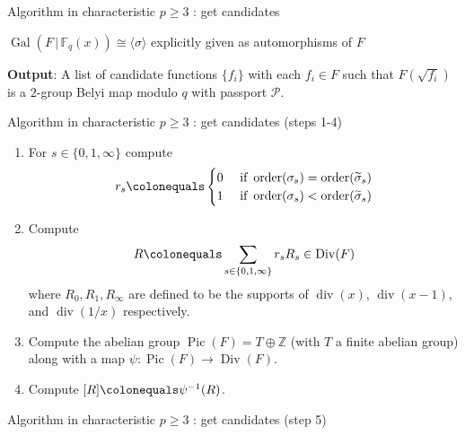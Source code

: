 \documentclass[xcolor=dvipsnames,handout]{beamer}
\theoremstyle{plain}
\newcommand{\ZZ}{\mathbb Z}
\newcommand{\wt}[1]{\widetilde{#1}}
\newcommand{\FF}{\mathbb{F}}
\DeclareMathOperator{\Div}{Div}
\DeclareMathOperator{\Pic}{Pic}
\DeclareMathOperator{\ddiv}{div}
\DeclareMathOperator{\order}{order}
\DeclareMathOperator{\Gal}{Gal}
\begin{document}
{\begin{frame}{Algorithm in characteristic $p\geq 3$ : get candidates}
\begin{itemize}
          $\Gal(F\,|\,\FF_q(x))\cong
          \langle\sigma\rangle$
          explicitly given
          as automorphisms of $F$
      \end{itemize}
      \textbf{Output}:
      A list of candidate functions
      $\{f_i\}$ with each $f_i\in F$
      such that $F(\sqrt{f_i})$ is a
      $2$-group Belyi map modulo $q$
      with passport $\mathcal{P}$.
    \end{frame}
    \begin{frame}{Algorithm in characteristic $p\geq 3$ : get candidates (steps 1-4)}
      \begin{enumerate}
        \item[1.]
          For $s\in\{0,1,\infty\}$
          compute
          \begin{align*}
            r_s\colonequals
            \begin{cases}
              0&
              \text{ if }
              \order(\sigma_s)=
              \order(\wt{\sigma}_s)\\
              1&
              \text{ if }
              \order(\sigma_s)<
              \order(\wt{\sigma}_s)\\
            \end{cases}
          \end{align*}
          \pause
        \item[2.]
          Compute
          \begin{equation*}
            R\colonequals
            \sum_{s\in\{0,1,\infty\}}r_sR_s
            \in\Div(F)
          \end{equation*}
          where
          $R_0,R_1,R_\infty$
          are defined to be the supports
          of
          $\ddiv(x)$,
          $\ddiv(x-1)$,
          and $\ddiv(1/x)$
          respectively.
          \pause
        \item[3.]
          Compute the abelian group
          $\Pic(F)=T\oplus\ZZ$
          (with $T$ a finite abelian group)
          along with a map
          $\psi\colon\Pic(F)\to\Div(F)$.
          \pause
        \item[4.]
          Compute
          $[R]\colonequals\psi^{-1}(R)$.
      \end{enumerate}
    \end{frame}
    \begin{frame}{Algorithm in characteristic $p\geq 3$ : get candidates (step 5)}
      \begin{enumerate}

\end{enumerate}
\end{frame}}
\end{document}
